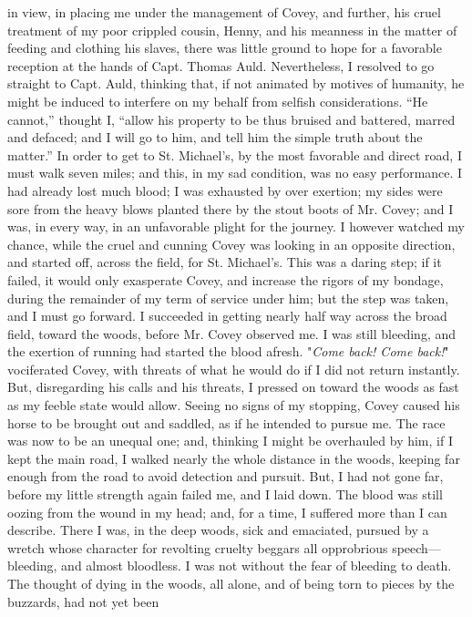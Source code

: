 in view, in placing me under the management of Covey, and further, his
cruel treatment of my poor crippled cousin, Henny, and his meanness in
the matter of feeding and clothing his slaves, there was little ground
to hope for a favorable reception at the hands of Capt. Thomas Auld.
Nevertheless, I resolved to go straight to Capt. Auld, thinking that, if
not animated by motives of humanity, he might be induced to interfere on
my behalf from selfish considerations. ``He cannot,'' thought I, ``allow
his property to be thus bruised and battered, marred and defaced; and I
will go to him, and tell him the simple truth about the matter.'' In
order to get to St. Michael's, by the most favorable and direct road, I
must walk seven miles; and this, in my sad condition, was no easy
performance. I had already lost much blood; I was exhausted by over
exertion; my sides were sore from the heavy blows planted there by the
stout boots of Mr. Covey; and I was, in every way, in an unfavorable
plight for the journey. I however watched my chance, while the cruel and
{}cunning Covey was looking in an opposite direction, and started off,
across the field, for St. Michael's. This was a daring step; if it
failed, it would only exasperate Covey, and increase the rigors of my
bondage, during the remainder of my term of service under him; but the
step was taken, and I must go forward. I succeeded in getting nearly
half way across the broad field, toward the woods, before Mr. Covey
observed me. I was still bleeding, and the exertion of running had
started the blood afresh. "\emph{Come back! Come back!}" vociferated
Covey, with threats of what he would do if I did not return instantly.
But, disregarding his calls and his threats, I pressed on toward the
woods as fast as my feeble state would allow. Seeing no signs of my
stopping, Covey caused his horse to be brought out and saddled, as if he
intended to pursue me. The race was now to be an unequal one; and,
thinking I might be overhauled by him, if I kept the main road, I walked
nearly the whole distance in the woods, keeping far enough from the road
to avoid detection and pursuit. But, I had not gone far, before my
little strength again failed me, and I laid down. The blood was still
oozing from the wound in my head; and, for a time, I suffered more than
I can describe. There I was, in the deep woods, sick and emaciated,
pursued by a wretch whose character for revolting cruelty beggars all
opprobrious speech---bleeding, and almost bloodless. I was not without
the fear of bleeding to death. The thought of dying in the woods, all
alone, and of being torn to pieces by the buzzards, had not yet been
